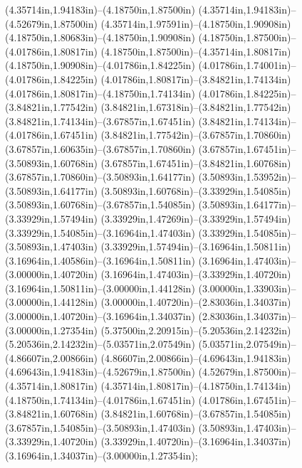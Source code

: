 (4.35714in,1.94183in)--(4.18750in,1.87500in) (4.35714in,1.94183in)--(4.52679in,1.87500in) (4.35714in,1.97591in)--(4.18750in,1.90908in) (4.18750in,1.80683in)--(4.18750in,1.90908in) (4.18750in,1.87500in)--(4.01786in,1.80817in) (4.18750in,1.87500in)--(4.35714in,1.80817in) (4.18750in,1.90908in)--(4.01786in,1.84225in) (4.01786in,1.74001in)--(4.01786in,1.84225in) (4.01786in,1.80817in)--(3.84821in,1.74134in) (4.01786in,1.80817in)--(4.18750in,1.74134in) (4.01786in,1.84225in)--(3.84821in,1.77542in) (3.84821in,1.67318in)--(3.84821in,1.77542in) (3.84821in,1.74134in)--(3.67857in,1.67451in) (3.84821in,1.74134in)--(4.01786in,1.67451in) (3.84821in,1.77542in)--(3.67857in,1.70860in) (3.67857in,1.60635in)--(3.67857in,1.70860in) (3.67857in,1.67451in)--(3.50893in,1.60768in) (3.67857in,1.67451in)--(3.84821in,1.60768in) (3.67857in,1.70860in)--(3.50893in,1.64177in) (3.50893in,1.53952in)--(3.50893in,1.64177in) (3.50893in,1.60768in)--(3.33929in,1.54085in) (3.50893in,1.60768in)--(3.67857in,1.54085in) (3.50893in,1.64177in)--(3.33929in,1.57494in) (3.33929in,1.47269in)--(3.33929in,1.57494in) (3.33929in,1.54085in)--(3.16964in,1.47403in) (3.33929in,1.54085in)--(3.50893in,1.47403in) (3.33929in,1.57494in)--(3.16964in,1.50811in) (3.16964in,1.40586in)--(3.16964in,1.50811in) (3.16964in,1.47403in)--(3.00000in,1.40720in) (3.16964in,1.47403in)--(3.33929in,1.40720in) (3.16964in,1.50811in)--(3.00000in,1.44128in) (3.00000in,1.33903in)--(3.00000in,1.44128in) (3.00000in,1.40720in)--(2.83036in,1.34037in) (3.00000in,1.40720in)--(3.16964in,1.34037in) (2.83036in,1.34037in)--(3.00000in,1.27354in) (5.37500in,2.20915in)--(5.20536in,2.14232in) (5.20536in,2.14232in)--(5.03571in,2.07549in) (5.03571in,2.07549in)--(4.86607in,2.00866in) (4.86607in,2.00866in)--(4.69643in,1.94183in) (4.69643in,1.94183in)--(4.52679in,1.87500in) (4.52679in,1.87500in)--(4.35714in,1.80817in) (4.35714in,1.80817in)--(4.18750in,1.74134in) (4.18750in,1.74134in)--(4.01786in,1.67451in) (4.01786in,1.67451in)--(3.84821in,1.60768in) (3.84821in,1.60768in)--(3.67857in,1.54085in) (3.67857in,1.54085in)--(3.50893in,1.47403in) (3.50893in,1.47403in)--(3.33929in,1.40720in) (3.33929in,1.40720in)--(3.16964in,1.34037in) (3.16964in,1.34037in)--(3.00000in,1.27354in);
